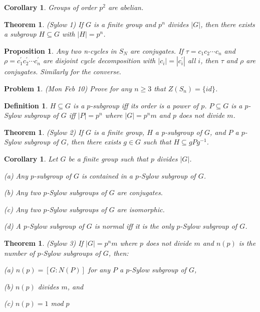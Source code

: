 \documentclass[12pt]{article}
\def\pr{^\prime}
\def\su{\subseteq}
\newtheorem{thm}[theorem]{Theorem}
\newtheorem{define}[theorem]{Definition}
\newtheorem{prop}[theorem]{Proposition}
\newtheorem{cor}[theorem]{Corollary}
\newtheorem{prob}{Problem}
\begin{document}
\begin{cor}
Groups of order $p^2$ are abelian.
\end{cor}

\begin{thm}
(Sylow 1) If $G$ is a finite group and $p^n$ divides $|G|$,
then there exists a subgroup $H\su G$ with $|H|=p^n$.
\end{thm}

\begin{prop}
Any two n-cycles in $S_N$ are conjugates.  If $\tau=c_1c_2\cdots c_n$
and $\rho=c_1\pr c_2\pr \cdots c_n\pr$ are
disjoint cycle decomposition with $|c_i|=|c_i\pr|$ all $i$, then
$\tau$ and $\rho$ are conjugates.  Similarly for the converse.
\end{prop}

\begin{prob}
(Mon Feb 10) Prove for any $n\geq 3$ that
$Z(S_n)=\{id\}$.
\end{prob}

\begin{define}
$H\su G$ is a $p$-subgroup iff its order is a power of $p$. $P\su G$
is a $p$-Sylow subgroup of $G$ iff $|P|=p^n$ where $|G|=p^nm$ and
$p$ does not divide $m$.
\end{define}

\begin{thm}
(Sylow 2) If $G$ is a finite group, $H$ a p-subgroup of $G$, and $P$
a $p$-Sylow subgroup of $G$, then there exists $g\in G$ such that
$H\su gPg^{-1}$.
\end{thm}

\begin{cor} Let $G$ be a finite group such that $p$ divides $|G|$.
\par (a) Any $p$-subgroup of $G$ is contained in a $p$-Sylow subgroup of $G$.
\par (b) Any two $p$-Sylow subgroups of $G$ are conjugates.
\par (c) Any two $p$-Sylow subgroups of $G$ are isomorphic.
\par (d) A $p$-Sylow subgroup of $G$ is normal iff it is the only
$p$-Sylow subgroup of $G$.
\end{cor}

\begin{thm}
(Sylow 3) If $|G|=p^nm$ where $p$ does not divide $m$ and
$n(p)$ is the number of $p$-Sylow subgroups of $G$, then:
\par (a) $n(p)=[G:N(P)]$ for any $P$ a $p$-Sylow subgroup of $G$,
\par (b) $n(p)$ divides $m$, and
\par (c) $n(p)=1$ mod $p$
\end{thm}
\end{document}
